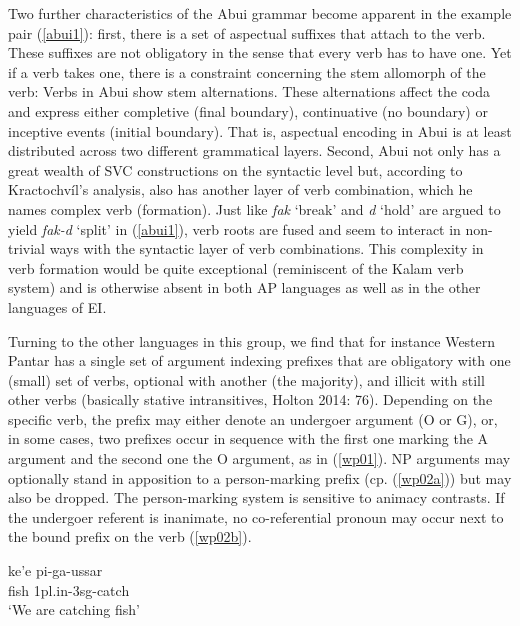 Two further characteristics of the Abui grammar become apparent in the example pair (\ref{abui1}): first, there is a set of aspectual suffixes that attach to the verb. These suffixes are not obligatory in the sense that every verb has to have one. Yet if a verb takes one, there is a constraint concerning the stem allomorph of the verb: Verbs in Abui show stem alternations. These alternations affect the coda and express either completive (final boundary), continuative (no boundary) or inceptive events (initial boundary). That is, aspectual encoding in Abui is at least distributed across two different grammatical layers. Second, Abui not only has a great wealth of SVC constructions on the syntactic level but, according to Kractochvíl's analysis, also has another layer of verb combination, which he names complex verb (formation). Just like \textit{fak} `break' and \textit{d} `hold' are argued to yield \textit{fak-d} `split' in (\ref{abui1}), verb roots are fused and seem to interact in non-trivial ways with the syntactic layer of verb combinations. This complexity in verb formation would be quite exceptional (reminiscent of the Kalam verb system) and is otherwise absent in both AP languages as well as in the other languages of EI.

Turning to the other languages in this group, we find that for instance Western Pantar has a single set of argument indexing prefixes that are obligatory with one (small) set of verbs, optional with another (the majority), and illicit with still other verbs (basically stative intransitives, Holton 2014: 76). Depending on the specific verb, the prefix may either denote an undergoer argument (O or G), or, in some cases, two prefixes occur in sequence with the first one marking the A argument and the second one the O argument, as in (\ref{wp01}). NP arguments may optionally stand in apposition to a person-marking prefix (cp. (\ref{wp02a})) but may also be dropped. The person-marking system is sensitive to animacy contrasts. If the undergoer referent is inanimate, no co-referential pronoun may occur next to the bound prefix on the verb (\ref{wp02b}).

\ea \label{wp01}
\gll ke'e pi-ga-ussar \\
fish \acs{1}\acs{pl}.\acs{in}-\acs{3}\acs{sg}-catch \\
\glft `We are catching fish' \\ 
\endgl
\xe

